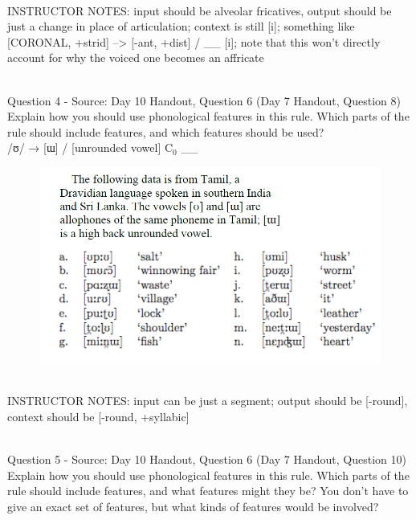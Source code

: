 \documentclass[12pt]{article}
\begin{document}
~\\
INSTRUCTOR NOTES: input should be alveolar fricatives, output should be just a change in place of articulation; context is still [i]; something like [CORONAL, +strid] --> [-ant, +dist] / \_\_ [i]; note that this won't directly account for why the voiced one becomes an affricate


~\\

{\large Question 4} - Source: Day 10 Handout, Question 6 (Day 7 Handout, Question 8)\\

Explain how you should use phonological features in this rule. Which parts of the rule should include features, and which features should be used?\\

/ʊ/ → {[ɯ]} / {[unrounded vowel]} C$_0$ \_\_

\begin{figure}[H]
\includegraphics{../images/tamil.png}
\end{figure}

~\\
INSTRUCTOR NOTES: input can be just a segment; output should be [-round], context should be [-round, +syllabic]


~\\

{\large Question 5} - Source: Day 10 Handout, Question 6 (Day 7 Handout, Question 10)\\

Explain how you should use phonological features in this rule. Which parts of the rule should include features, and what features might they be? You don't have to give an exact set of features, but what kinds of features would be involved?\\
\end{document}

